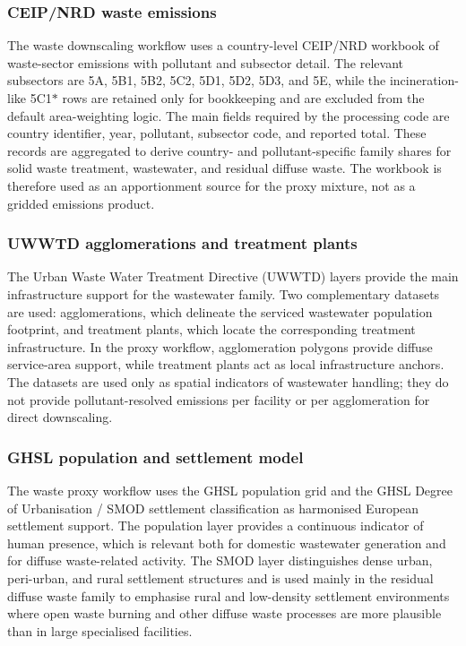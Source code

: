\subsubsection*{CEIP/NRD waste emissions}
\label{app:waste_ceip}

The waste downscaling workflow uses a country-level CEIP/NRD workbook of
waste-sector emissions with pollutant and subsector detail. The relevant
subsectors are 5A, 5B1, 5B2, 5C2, 5D1, 5D2, 5D3, and 5E, while the
incineration-like 5C1$\ast$ rows are retained only for bookkeeping and are
excluded from the default area-weighting logic. The main fields required by the
processing code are country identifier, year, pollutant, subsector code, and
reported total. These records are aggregated to derive country- and
pollutant-specific family shares for solid waste treatment, wastewater, and
residual diffuse waste. The workbook is therefore used as an apportionment
source for the proxy mixture, not as a gridded emissions product.

\subsubsection*{UWWTD agglomerations and treatment plants}
\label{app:waste_uwwtd}

The Urban Waste Water Treatment Directive (UWWTD) layers provide the main
infrastructure support for the wastewater family. Two complementary datasets are
used: agglomerations, which delineate the serviced wastewater population
footprint, and treatment plants, which locate the corresponding treatment
infrastructure. In the proxy workflow, agglomeration polygons provide diffuse
service-area support, while treatment plants act as local infrastructure
anchors. The datasets are used only as spatial indicators of wastewater
handling; they do not provide pollutant-resolved emissions per facility or per
agglomeration for direct downscaling.

\subsubsection*{GHSL population and settlement model}
\label{app:waste_ghsl}

The waste proxy workflow uses the GHSL population grid and the GHSL Degree of
Urbanisation / SMOD settlement classification as harmonised European settlement
support. The population layer provides a continuous indicator of human presence,
which is relevant both for domestic wastewater generation and for diffuse
waste-related activity. The SMOD layer distinguishes dense urban, peri-urban,
and rural settlement structures and is used mainly in the residual diffuse
waste family to emphasise rural and low-density settlement environments where
open waste burning and other diffuse waste processes are more plausible than in
large specialised facilities.

